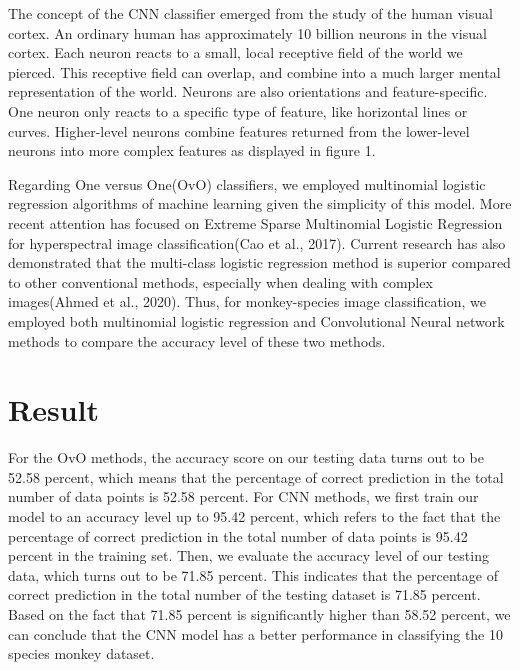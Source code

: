\documentclass[12pt, letterpaper]{article}
\begin{document}
      The concept of the CNN classifier emerged from the study of the human visual cortex. An ordinary human has approximately 10 billion neurons in the visual cortex. Each neuron reacts to a small, local receptive field of the world we pierced. This receptive field can overlap, and combine into a much larger mental representation of the world. Neurons are also orientations and feature-specific. One neuron only reacts to a specific type of feature, like horizontal lines or curves. Higher-level neurons combine features returned from the lower-level neurons into more complex features as displayed in figure 1.
       
 
 
        Regarding One versus One(OvO) classifiers, we employed multinomial logistic regression algorithms of machine learning given the simplicity of this model. More recent attention has focused on Extreme Sparse Multinomial Logistic Regression for hyperspectral image classification(Cao et al., 2017). Current research has also demonstrated that the multi-class logistic regression method is superior compared to other conventional methods, especially when dealing with complex images(Ahmed et al., 2020). Thus, for monkey-species image classification, we employed both multinomial logistic regression and Convolutional Neural network methods to compare the accuracy level of these two methods.
 
\section{Result}

        \quad \quad For the OvO methods, the accuracy score on our testing data turns out to be 52.58 percent, which means that the percentage of correct prediction in the total number of data points is 52.58 percent. For CNN methods, we first train our model to an accuracy level up to 95.42 percent, which refers to the fact that the percentage of correct prediction in the total number of data points is 95.42 percent in the training set. Then, we evaluate the accuracy level of our testing data, which turns out to be 71.85 percent. This indicates that the percentage of correct prediction in the total number of the testing dataset is 71.85 percent. Based on the fact that 71.85 percent is significantly higher than 58.52 percent, we can conclude that the CNN model has a better performance in classifying the 10 species monkey dataset.
\end{document}

